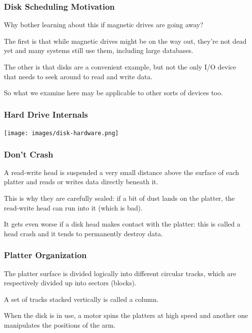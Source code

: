 \begin{frame}
\frametitle{Disk Scheduling Motivation}

Why bother learning about this if magnetic drives are going away? 

The first is that while magnetic drives might be on the way out, they're not dead yet and many systems still use them, including large databases. 

The other is that disks are a convenient example, but not the only I/O device that needs to seek around to read and write data.

So what we examine here may be applicable to other sorts of devices too.

\end{frame}

\begin{frame}
\frametitle{Hard Drive Internals}

\begin{center}
	\texttt{[image: images/disk-hardware.png]}
\end{center}

\end{frame}

\begin{frame}
\frametitle{Don't Crash}

A read-write head is suspended a very small distance above the surface of each platter and reads or writes data directly beneath it. 

This is why they are carefully sealed: if a bit of dust lands on the platter, the read-write head can run into it (which is bad). 

It gets even worse if a disk head makes contact with the platter: this is called a head crash and it tends to permanently destroy data. 


\end{frame}

\begin{frame}
\frametitle{Platter Organization}

The platter surface is divided logically into different circular tracks, which are respectively divided up into sectors (blocks). 

A set of tracks stacked vertically is called a column. 

When the disk is in use, a motor spins the platters at high speed and another one manipulates the positions of the arm.


\end{frame}

